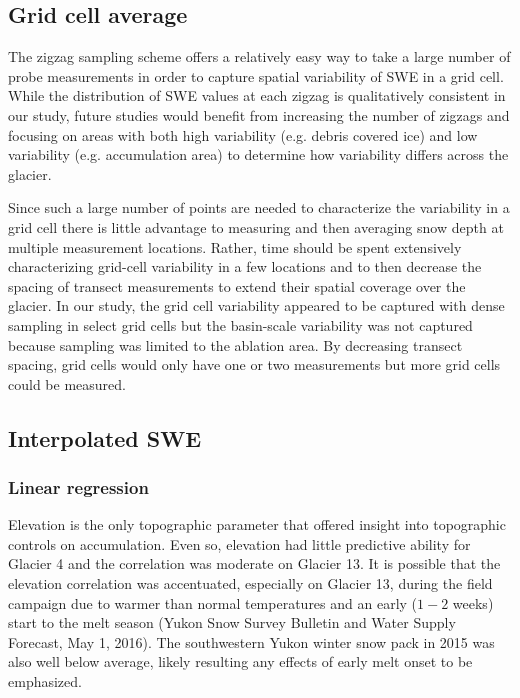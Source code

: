 \documentclass[twocolumn, letterpaper]{igs}
\begin{document}
\subsection{Grid cell average}

The zigzag sampling scheme offers a relatively easy way to take a large number of probe measurements in order to capture spatial variability of SWE in a grid cell. While the distribution of SWE values at each zigzag is qualitatively consistent in our study, future studies would benefit from increasing the number of zigzags and focusing on areas with both high variability (e.g. debris covered ice) and low variability (e.g. accumulation area) to determine how variability differs across the glacier.

Since such a large number of points are needed to characterize the variability in a grid cell there is little advantage to measuring and then averaging snow depth at multiple measurement locations. Rather, time should be spent extensively characterizing grid-cell variability in a few locations and to then decrease the spacing of transect measurements to extend their spatial coverage over the glacier. In our study, the grid cell variability appeared to be captured with dense sampling in select grid cells but the basin-scale variability was not captured because sampling was limited to the ablation area. By decreasing transect spacing, grid cells would only have one or two measurements but more grid cells could be measured. 

\subsection{Interpolated SWE}

\subsubsection{Linear regression}

Elevation is the only topographic parameter that offered insight into topographic controls on accumulation. Even so, elevation had little predictive ability for Glacier 4 and the correlation was moderate on Glacier 13. It is possible that the elevation correlation was accentuated, especially on Glacier 13, during the field campaign due to warmer than normal temperatures and an early ($1-2$ weeks) start to the melt season (Yukon Snow Survey Bulletin and Water Supply Forecast, May 1, 2016). The southwestern Yukon winter snow pack in 2015 was also well below average, likely resulting any effects of early melt onset to be emphasized.
\end{document}

